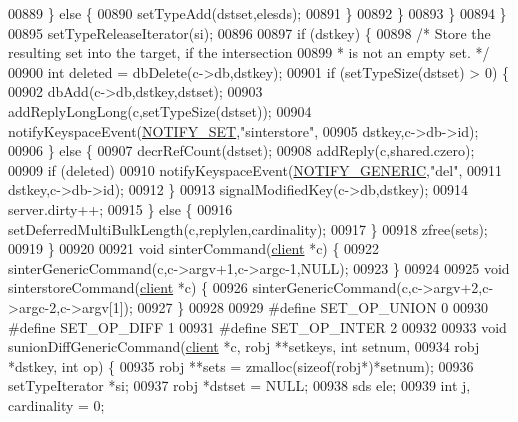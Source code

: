 \begin{DoxyCode}
00889                 \} \textcolor{keywordflow}{else} \{
00890                     setTypeAdd(dstset,elesds);
00891                 \}
00892             \}
00893         \}
00894     \}
00895     setTypeReleaseIterator(si);
00896 
00897     \textcolor{keywordflow}{if} (dstkey) \{
00898         \textcolor{comment}{/* Store the resulting set into the target, if the intersection}
00899 \textcolor{comment}{         * is not an empty set. */}
00900         \textcolor{keywordtype}{int} deleted = dbDelete(c->db,dstkey);
00901         \textcolor{keywordflow}{if} (setTypeSize(dstset) > 0) \{
00902             dbAdd(c->db,dstkey,dstset);
00903             addReplyLongLong(c,setTypeSize(dstset));
00904             notifyKeyspaceEvent(\hyperlink{server_8h_a625aec945b2152a46979b1b21f2af274}{NOTIFY\_SET},\textcolor{stringliteral}{"sinterstore"},
00905                 dstkey,c->db->id);
00906         \} \textcolor{keywordflow}{else} \{
00907             decrRefCount(dstset);
00908             addReply(c,shared.czero);
00909             \textcolor{keywordflow}{if} (deleted)
00910                 notifyKeyspaceEvent(\hyperlink{server_8h_a9fa53dd1068e62365f3964ad3479eec2}{NOTIFY\_GENERIC},\textcolor{stringliteral}{"del"},
00911                     dstkey,c->db->id);
00912         \}
00913         signalModifiedKey(c->db,dstkey);
00914         server.dirty++;
00915     \} \textcolor{keywordflow}{else} \{
00916         setDeferredMultiBulkLength(c,replylen,cardinality);
00917     \}
00918     zfree(sets);
00919 \}
00920 
00921 \textcolor{keywordtype}{void} sinterCommand(\hyperlink{structclient}{client} *c) \{
00922     sinterGenericCommand(c,c->argv+1,c->argc-1,NULL);
00923 \}
00924 
00925 \textcolor{keywordtype}{void} sinterstoreCommand(\hyperlink{structclient}{client} *c) \{
00926     sinterGenericCommand(c,c->argv+2,c->argc-2,c->argv[1]);
00927 \}
00928 
00929 \textcolor{preprocessor}{#}\textcolor{preprocessor}{define} \textcolor{preprocessor}{SET\_OP\_UNION} 0
00930 \textcolor{preprocessor}{#}\textcolor{preprocessor}{define} \textcolor{preprocessor}{SET\_OP\_DIFF} 1
00931 \textcolor{preprocessor}{#}\textcolor{preprocessor}{define} \textcolor{preprocessor}{SET\_OP\_INTER} 2
00932 
00933 \textcolor{keywordtype}{void} sunionDiffGenericCommand(\hyperlink{structclient}{client} *c, robj **setkeys, \textcolor{keywordtype}{int} setnum,
00934                               robj *dstkey, \textcolor{keywordtype}{int} op) \{
00935     robj **sets = zmalloc(\textcolor{keyword}{sizeof}(robj*)*setnum);
00936     setTypeIterator *si;
00937     robj *dstset = NULL;
00938     sds ele;
00939     \textcolor{keywordtype}{int} j, cardinality = 0;

\end{DoxyCode}
